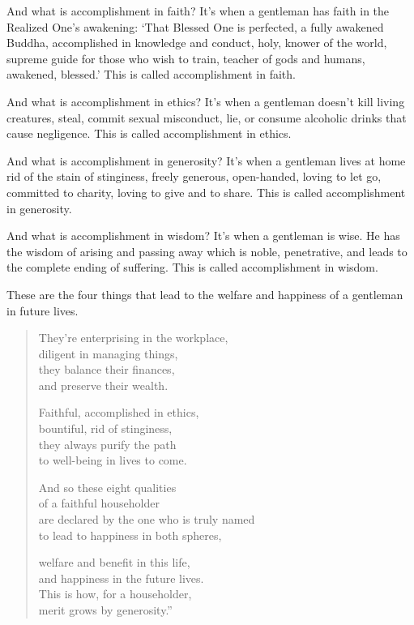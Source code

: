 \documentclass[12pt,openany]{book}%
\begin{document}
And what is accomplishment in faith? It’s when a gentleman has faith in the Realized One’s awakening: ‘That Blessed One is perfected, a fully awakened Buddha, accomplished in knowledge and conduct, holy, knower of the world, supreme guide for those who wish to train, teacher of gods and humans, awakened, blessed.’ This is called accomplishment in faith. 

And what is accomplishment in ethics? It’s when a gentleman doesn’t kill living creatures, steal, commit sexual misconduct, lie, or consume alcoholic drinks that cause negligence. This is called accomplishment in ethics. 

And what is accomplishment in generosity? It’s when a gentleman lives at home rid of the stain of stinginess, freely generous, open-handed, loving to let go, committed to charity, loving to give and to share. This is called accomplishment in generosity. 

And what is accomplishment in wisdom? It’s when a gentleman is wise. He has the wisdom of arising and passing away which is noble, penetrative, and leads to the complete ending of suffering. This is called accomplishment in wisdom. 

These are the four things that lead to the welfare and happiness of a gentleman in future lives. 

\begin{verse}%
They’re enterprising in the workplace, \\
diligent in managing things, \\
they balance their finances, \\
and preserve their wealth. 

Faithful, accomplished in ethics, \\
bountiful, rid of stinginess, \\
they always purify the path \\
to well-being in lives to come. 

And so these eight qualities \\
of a faithful householder \\
are declared by the one who is truly named \\
to lead to happiness in both spheres, 

welfare and benefit in this life, \\
and happiness in the future lives. \\
This is how, for a householder, \\
merit grows by generosity.” 

%
\end{verse}
\end{document}
